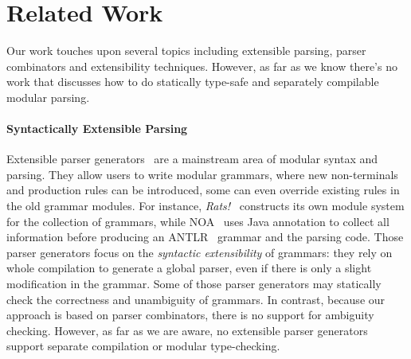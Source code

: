 \section{Related Work}\label{sec:relatedwork}

%
%
%
%

Our work touches upon several topics including extensible parsing,
parser combinators and extensibility techniques. However, as far as we
know there's no work that discusses how to do statically type-safe and
separately compilable modular parsing.

\begin{comment}
There has been a
great amount of related papers on those topics. Some
inspired us of this paper and encourage us for more exploration. This
section will try to lead a discussion on what difference we have made.
\end{comment}

\paragraph{Syntactically Extensible Parsing}
Extensible parser generators~\cite{antlr1995,Grimm2006,Gouseti2014,Warth2016}
are a mainstream area of modular syntax and parsing. They allow users to write
modular grammars, where new
non-terminals and production rules can be introduced, some can even
override existing rules in the old grammar modules. For instance,
\textit{Rats!}~\cite{Grimm2006} constructs its own module system for
the collection of grammars, while NOA~\cite{Gouseti2014} uses Java
annotation to collect all information before producing an ANTLR~\cite{antlr1995} grammar
and the parsing code. Those parser
generators focus on the \textit{syntactic extensibility} of grammars:
they rely on whole compilation to generate a global parser, even if
there is only a slight modification in the grammar. Some of those
parser generators may statically check the correctness and unambiguity
of grammars. In contrast, because our approach is based on parser
combinators, there is no support for ambiguity checking.  However, as
far as we are aware, no extensible parser generators support separate
compilation or modular type-checking.


